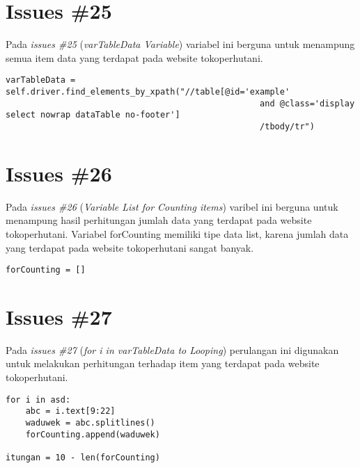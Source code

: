 \section{Issues \#25}
Pada \textit{issues \#25} (\textit{varTableData Variable}) variabel ini berguna untuk menampung semua item data yang terdapat pada website tokoperhutani. 
\begin{verbatim}
varTableData = self.driver.find_elements_by_xpath("//table[@id='example' 
                                                   and @class='display select nowrap dataTable no-footer']
                                                   /tbody/tr")
\end{verbatim}

\section{Issues \#26}
Pada \textit{issues \#26} (\textit{Variable List for Counting items}) varibel ini berguna untuk menampung hasil perhitungan jumlah data yang terdapat pada website tokoperhutani. Variabel forCounting memiliki tipe data list, karena jumlah data yang terdapat pada website tokoperhutani sangat banyak.
\begin{verbatim}
forCounting = []
\end{verbatim}

\section{Issues \#27}
Pada \textit{issues \#27} (\textit{for i in varTableData to Looping}) perulangan ini digunakan untuk melakukan perhitungan terhadap item yang terdapat pada website tokoperhutani.
\begin{verbatim}
for i in asd:
    abc = i.text[9:22]
    waduwek = abc.splitlines()
    forCounting.append(waduwek)

itungan = 10 - len(forCounting)
\end{verbatim}

